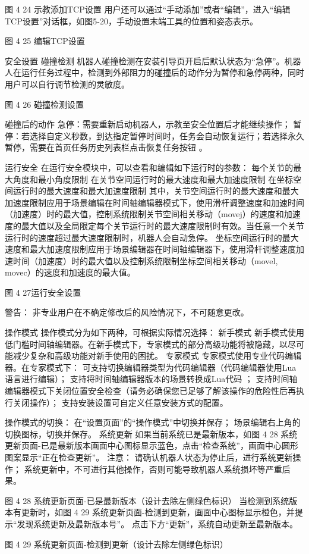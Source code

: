 图 4 24 示教添加TCP设置
用户还可以通过“手动添加”或者“编辑”，进入“编辑TCP设置”对话框，如图5-20，手动设置末端工具的位置和姿态表示。
 
图 4 25  编辑TCP设置

安全设置
碰撞检测
机器人碰撞检测在安装引导页开启后默认状态为“急停”。机器人在运行任务过程中，检测到外部阻力的碰撞后的动作分为暂停和急停两种，同时用户可以自行调节检测的灵敏度。

  
图 4 26 碰撞检测设置

碰撞后的动作 
急停：需要重新启动机器人，示教至安全位置后才能继续操作；
暂停：若选择自定义秒数，到达指定暂停时间时，任务会自动恢复运行；若选择永久暂停，需要在首页任务历史列表栏点击恢复任务按钮 。

运行安全
在运行安全模块中，可以查看和编辑如下运行时的参数：
每个关节的最大角度和最小角度限制
在关节空间运行时的最大速度和最大加速度限制
在坐标空间运行时的最大速度和最大加速度限制
其中，关节空间运行时的最大速度和最大加速度限制应用于场景编辑在时间轴编辑器模式下，使用滑杆调整速度和加速时间（加速度）时的最大值，控制系统限制关节空间相关移动（movej）的速度和加速度的最大值以及全局限定每个关节运行时的最大速度限制时有效。当任意一个关节运行时的速度超过最大速度限制时，机器人会自动急停。
坐标空间运行时的最大速度和最大加速度限制应用于场景编辑器在时间轴编辑器下，使用滑杆调整速度加速时间（加速度）时的最大值以及控制系统限制坐标空间相关移动（movel, movec）的速度和加速度的最大值。

 
图 4 27运行安全设置

 	警告：
非专业用户在不确定修改后的风险情况下，不可随意更改。

操作模式
操作模式分为如下两种，可根据实际情况选择：
新手模式
新手模式使用低门槛时间轴编辑器。在新手模式下，专家模式的部分高级功能将被隐藏，以尽可能减少复杂和高级功能对新手使用的困扰。
专家模式
专家模式使用专业代码编辑器。在专家模式下：
可支持切换编辑器类型为代码编辑器（代码编辑器使用Lua语言进行编辑）；
支持将时间轴编辑器版本的场景转换成Lua代码 ；
支持时间轴编辑器模式下关闭位置安全检查（请务必确保您已足够了解该操作的危险性后再执行关闭操作）；
支持安装设置可自定义任意安装方式的配置。

操作模式的切换：
在“设置页面”的“操作模式”中切换并保存；
场景编辑右上角的切换图标，切换并保存。
系统更新
如果当前系统已是最新版本，如图 4 28 系统更新页面-已是最新版本画面中心图标显示蓝色，点击“检查系统”，画面中心圆形图案显示“正在检查更新”。
 	注意：
请确认机器人状态为停止后，进行系统更新操作；
系统更新中，不可进行其他操作，否则可能导致机器人系统损坏等严重后果。
 
图 4 28 系统更新页面-已是最新版本（设计去除左侧绿色标识）
当检测到系统版本有更新时，如图 4 29 系统更新页面-检测到更新，画面中心图标显示橙色，并提示“发现系统更新及最新版本号”。 点击下方“更新”，系统自动更新至最新版本。
 
图 4 29 系统更新页面-检测到更新（设计去除左侧绿色标识）
